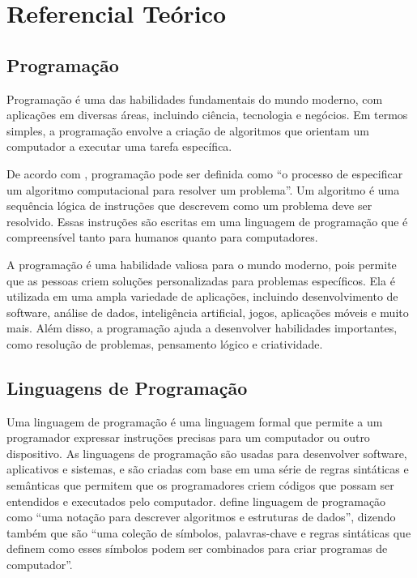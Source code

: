 \chapter[Referencial Teórico]{Referencial Teórico}

\section{Programação}

Programação é uma das habilidades fundamentais do mundo moderno, com aplicações em diversas áreas, incluindo ciência, tecnologia e negócios. Em termos simples, a programação envolve a criação de algoritmos que orientam um computador a executar uma tarefa específica.

De acordo com , programação pode ser definida como ``o processo de especificar um algoritmo computacional para resolver um problema''. Um algoritmo é uma sequência lógica de instruções que descrevem como um problema deve ser resolvido. Essas instruções são escritas em uma linguagem de programação que é compreensível tanto para humanos quanto para computadores.

A programação é uma habilidade valiosa para o mundo moderno, pois permite que as pessoas criem soluções personalizadas para problemas específicos. Ela é utilizada em uma ampla variedade de aplicações, incluindo desenvolvimento de software, análise de dados, inteligência artificial, jogos, aplicações móveis e muito mais. Além disso, a programação ajuda a desenvolver habilidades importantes, como resolução de problemas, pensamento lógico e criatividade.

\section{Linguagens de Programação}

Uma linguagem de programação é uma linguagem formal que permite a um programador expressar instruções precisas para um computador ou outro dispositivo. As linguagens de programação são usadas para desenvolver software, aplicativos e sistemas, e são criadas com base em uma série de regras sintáticas e semânticas que permitem que os programadores criem códigos que possam ser entendidos e executados pelo computador.  define linguagem de programação como ``uma notação para descrever algoritmos e estruturas de dados'', dizendo também que são ``uma coleção de símbolos, palavras-chave e regras sintáticas que definem como esses símbolos podem ser combinados para criar programas de computador''.

